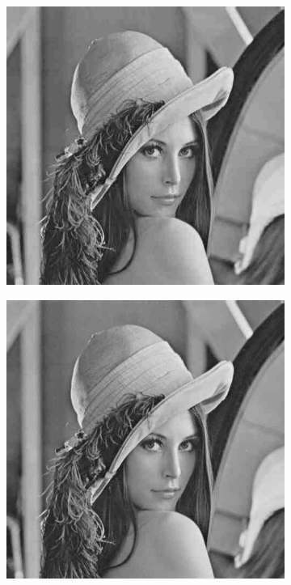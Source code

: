 \documentclass{article}
\begin{document}
\begin{figure}[htbp]
\begin{subfigure}{.19\textwidth}
    \end{subfigure}
    \begin{subfigure}{.19\textwidth}
        \includegraphics[width=\linewidth]{img/jpeg/20.jpg}
    \end{subfigure}
    \begin{subfigure}{.19\textwidth}
        \includegraphics[width=\linewidth]{img/jpeg/30.jpg}

\end{subfigure}
\end{figure}
\end{document}
